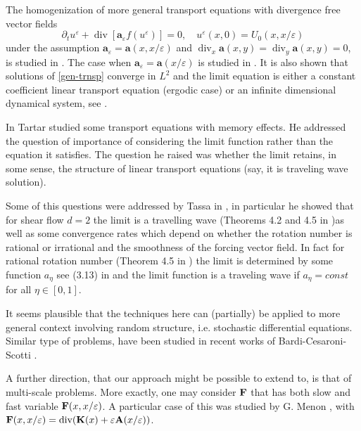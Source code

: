 \documentclass[10pt]{amsart}
\theoremstyle{definition}                                                                                  \newtheorem{remark}[theorem]{Remark}
\theoremstyle{theorem}
\begin{document}
\medskip

The homogenization of more general transport equations with divergence free vector fields \begin{equation}\label{gen-trnsp}
{\partial}_t u^{\varepsilon}+{\operatorname{div}}[{\textbf{a}}_{\varepsilon} f(u^{\varepsilon})]=0, \quad u^{\varepsilon}(x, 0)=U_0(x, x/{\varepsilon})
\end{equation}
under the assumption ${\textbf{a}} _{\varepsilon} ={\textbf{a}} (x, x/{\varepsilon})$ and ${\operatorname{div}}_x{\textbf{a}} (x, y)={\operatorname{div}}_y{\textbf{a}}(x, y)=0$, is studied in  \cite{Weinan}. 
The case when ${\textbf{a}}_{\varepsilon}={\textbf{a}}(x/{\varepsilon})$ is studied in \cite{Hou}. It is also shown that solutions of \eqref{gen-trnsp}
converge in $L^2$ and the limit equation is either a constant coefficient linear transport equation (ergodic case) 
or an infinite dimensional dynamical system, see  \cite{Weinan, Hou}.

In \cite{Tartar} Tartar studied some transport equations with memory effects. He addressed the question
of importance of considering the limit function rather than the equation it satisfies. The question he raised was
  whether the limit  retains, in some sense, the structure of linear transport equations (say, it is traveling wave solution).

Some of this questions were addressed by Tassa in \cite{Tassa}, in particular he showed that for shear flow 
$d=2$ the limit is 
a travelling wave (Theorems 4.2 and 4.5 in \cite{Tassa})as well as some convergence rates which depend on whether the 
rotation number is  
rational or irrational and the smoothness of the forcing vector field. In fact for rational rotation number (Theorem 4.5 in \cite{Tassa}) 
the limit is determined by some function $a_\eta$ see (3.13) in \cite{Tassa} and the limit function is a
traveling wave if $a_\eta=const$ for all $\eta\in [0,1]$.

It seems plausible that the techniques here can (partially)
 be applied to more general context involving random structure, i.e. stochastic differential equations.
  Similar type of problems, have been studied in recent works of Bardi-Cesaroni-Scotti  \cite{BCS}. 
  
 A further direction, that our approach might be possible to extend to, is that of multi-scale problems. More exactly,
 one may consider ${\bf F}$ that has both slow and fast variable ${\bf F} (x,x/{\varepsilon})$. A particular case of this was studied by 
 G. Menon \cite{Menon}, with ${\bf F} (x,x/{\varepsilon}) = \hbox{div} ({\bf K}(x) + {\varepsilon} {\bf A}(x/{\varepsilon}) ) $.
 
\end{document}
